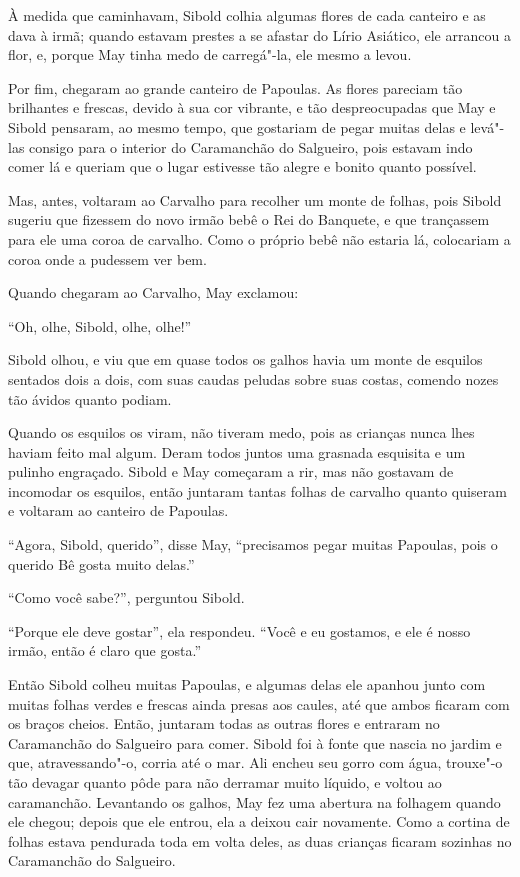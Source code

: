 À medida que caminhavam, Sibold colhia algumas flores de cada canteiro e
as dava à irmã; quando estavam prestes a se afastar do Lírio
Asiático, ele arrancou a flor, e, porque May tinha medo de carregá"-la,
ele mesmo a levou.

Por fim, chegaram ao grande canteiro de Papoulas. As flores pareciam tão
brilhantes e frescas, devido à sua cor vibrante, e tão despreocupadas
que May e Sibold pensaram, ao mesmo tempo, que gostariam de pegar
muitas delas e levá"-las consigo para o interior do Caramanchão do
Salgueiro, pois estavam indo comer lá e queriam que o lugar estivesse
tão alegre e bonito quanto possível.

Mas, antes, voltaram ao Carvalho para recolher um monte de folhas, pois
Sibold sugeriu que fizessem do novo irmão bebê o Rei do Banquete, e que
trançassem para ele uma coroa de carvalho. Como o próprio bebê não
estaria lá, colocariam a coroa onde a pudessem ver bem.

Quando chegaram ao Carvalho, May exclamou:

``Oh, olhe, Sibold, olhe, olhe!''

Sibold olhou, e viu que em quase todos os galhos havia um monte de
esquilos sentados dois a dois, com suas caudas peludas sobre suas
costas, comendo nozes tão ávidos quanto podiam.

Quando os esquilos os viram, não tiveram medo, pois as crianças nunca
lhes haviam feito mal algum. Deram todos juntos uma grasnada esquisita e
um pulinho engraçado. Sibold e May começaram a rir, mas não gostavam de
incomodar os esquilos, então juntaram tantas folhas de carvalho quanto
quiseram e voltaram ao canteiro de Papoulas.

``Agora, Sibold, querido'', disse May, ``precisamos pegar muitas
Papoulas, pois o querido Bê gosta muito delas.''

``Como você sabe?'', perguntou Sibold.

``Porque ele deve gostar'', ela respondeu. ``Você e eu gostamos, e ele é
nosso irmão, então é claro que gosta.''

Então Sibold colheu muitas Papoulas, e algumas delas ele apanhou junto
com muitas folhas verdes e frescas ainda presas aos caules, até que
ambos ficaram com os braços cheios. Então, juntaram todas as outras
flores e entraram no Caramanchão do Salgueiro para comer. Sibold foi à
fonte que nascia no jardim e que, atravessando"-o, corria até o mar. Ali
encheu seu gorro com água, trouxe"-o tão devagar quanto pôde para não
derramar muito líquido, e voltou ao caramanchão. Levantando os galhos,
May fez uma abertura na folhagem quando ele chegou; depois que ele
entrou, ela a deixou cair novamente. Como a cortina de folhas estava
pendurada toda em volta deles, as duas crianças ficaram sozinhas no
Caramanchão do Salgueiro.

